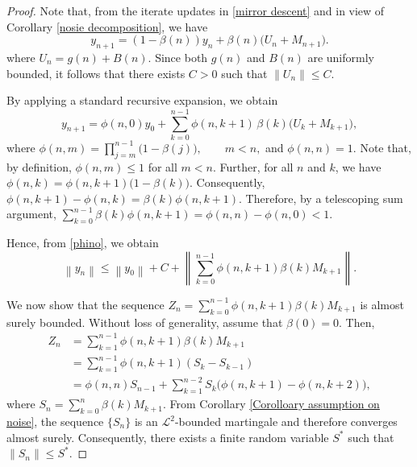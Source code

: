 \documentclass[9pt,journal,twoside,web]{ieeecolor}
\newcommand{\norm}[1]{\left\lVert #1 \right\rVert}
\begin{document}
\begin{proof}
Note that, from the iterate updates in \eqref{mirror descent} and in view of Corollary \ref{nosie decomposition}, we have
 \begin{equation*}
    y_{n+1}
    =
    (1-\beta(n))y_n
    +
    \beta(n)
    \big(
    U_n + M_{n+1}
    \big).
\end{equation*}
where $U_n = g(n) + B(n).$
Since both $g(n)$ and $B(n)$ are uniformly bounded, it follows that there exists  $C>0$ such that $\norm{U_n} \leq C.$

By applying a standard recursive expansion, we obtain
\begin{equation}
    y_{n+1}
    =
    \phi(n,0)y_0
    +
    \sum_{k=0}^{n-1}
    \phi(n,k+1)\,
    \beta(k)
    \big(
    U_k + M_{k+1}
    \big),
    \label{phino}
\end{equation}
where $ \phi(n,m)
    =
    \prod_{j=m}^{n-1}
    \big(
    1-\beta(j)
    \big),
    \qquad m<n,$
and $\phi(n,n)=1.$ Note that, by definition, $\phi(n,m)\leq 1$ for all $m<n$. Further, for all $n$ and $k$, we have
$ \phi(n,k)
    =
    \phi(n,k+1)
    \big(
    1-\beta(k)
    \big).$ 
Consequently, $  \phi(n,k+1)-\phi(n,k) =
    \beta(k)\phi(n,k+1).$
Therefore, by a telescoping sum argument,
$ \sum_{k=0}^{n-1}
    \beta(k)\phi(n,k+1)
    =
    \phi(n,n)-\phi(n,0)
    <1.$

Hence, from \eqref{phino}, we obtain
\begin{equation}
    \norm{y_n}
    \leq
    \norm{y_0}
    +
    C
    +
    \norm{
    \sum_{k=0}^{n-1}
    \phi(n,k+1)\beta(k)M_{k+1}
    }.
    \label{ynams}
\end{equation}

We now show that the sequence $Z_n
=
\sum_{k=0}^{n-1}
\phi(n,k+1)\beta(k)M_{k+1}$
is almost surely bounded. Without loss of generality, assume that $\beta(0)=0$. Then,
\begin{equation*}
    \begin{split}
        Z_n
        &=
        \sum_{k=1}^{n-1}
        \phi(n,k+1)\beta(k)M_{k+1}
        \\
        &=
        \sum_{k=1}^{n-1}
        \phi(n,k+1)
        (S_k-S_{k-1})
        \\
        &=
        \phi(n,n)S_{n-1}
        +
        \sum_{k=1}^{n-2}
        S_k
        \big(
        \phi(n,k+1)-\phi(n,k+2)
        \big),
    \end{split}
\end{equation*}
where $S_n
=
\sum_{k=0}^{n}
\beta(k)M_{k+1}.$
From Corollary \ref{Corolloary assumption on noise}, the sequence $\{S_n\}$ is an $\mathcal{L}^2$-bounded martingale and therefore converges almost surely. Consequently, there exists a finite random variable $S^\ast$ such that $\norm{S_n}\leq S^\ast.$


\end{proof}
\end{document}
